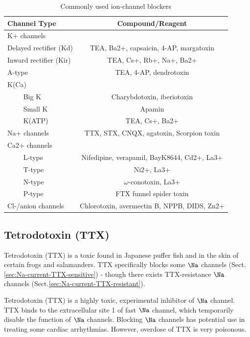\begin{table}[hbt]
\begin{center}
    \begin{tabular}{lc}
Channel Type & Compound/Reagent \\
        \hline
K+ channels & \\
Delayed rectifier (Kd) & TEA, Ba2+, capsaicin, 4-AP, margatoxin \\
Inward rectifier (Kir) & TEA, Cs+, Rb+, Na+, Ba2+ \\
A-type & TEA, 4-AP, dendrotoxin \\
K(Ca) & \\
$\qquad$ Big K & Charybdotoxin, iberiotoxin \\
$\qquad$ Small K & Apamin \\
$\qquad$ K(ATP) & TEA, Cs+, Ba2+ \\
Na+ channels & TTX, STX, CNQX, agatoxin, 
Scorpion toxin \\
Ca2+ channels & \\
$\qquad$ L-type & Nifedipine, verapamil, 
BayK8644, Cd2+, La3+ \\
$\qquad$ T-type & Ni2+, La3+ \\
$\qquad$ N-type & $\omega$-conotoxin, La3+ \\
$\qquad$ P-type & FTX funnel spider toxin \\
Cl-/anion channels & Chlorotoxin, avermectin B, NPPB,
DIDS, Zn2+ \\
        \hline
    \end{tabular}
\end{center}
\caption{Commonly used ion-channel blockers}
\label{tab:ion-channel-blockers}
\end{table}


\subsection{Tetrodotoxin (TTX)}
\label{sec:tetrodotoxin}
\label{sec:TTX}

Tetrodotoxin (TTX) is a toxic found in Japanese puffer fish and in the skin of
certain frogs and salamanders. TTX specifically blocks some $\Na$ channels
(Sect.\ref{sec:Na-current-TTX-sensitive}) - though there exists 
TTX-resistance $\Na$ channels (Sect.\ref{sec:Na-current-TTX-resistant}).

Tetrodotoxin (TTX) is a highly toxic, experimental inhibitor of $\Na$ channel.
TTX binds to the extracellular site 1 of fast $\Na$ channel, which temporarily
disable the function of $\Na$ channels. Blocking $\Na$ channels has potential
use in treating some cardiac arrhythmias. However, overdose of TTX is very
poisonous.

